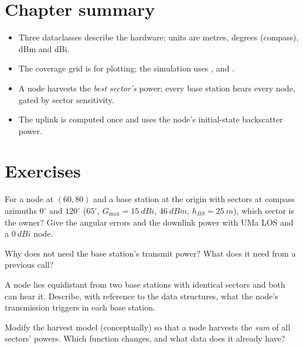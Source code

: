 \section{Chapter summary}
\begin{itemize}
 \item Three dataclasses describe the hardware; units are metres, degrees (compass), dBm and dBi.
 \item The coverage grid is for plotting; the simulation uses ,  and .
 \item A node harvests the \emph{best sector's} power; every base station hears every node, gated by sector sensitivity.
 \item The uplink is computed once and uses the node's initial-state backscatter power.
\end{itemize}

\section*{Exercises}
\begin{exercise}
For a node at $(60,80)$ and a base station at the origin with sectors at compass azimuths $0^\circ$ and $120^\circ$ ($65^\circ$, $G_{\max}=\SI{15}{dBi}$, $\SI{46}{dBm}$, $h_{BS}=\SI{25}{m}$), which sector is the owner? Give the angular errors and the downlink power with UMa LOS and a $\SI{0}{dBi}$ node.
\end{exercise}
\begin{exercise}
Why does  not need the base station's transmit power? What does it need from a previous call?
\end{exercise}
\begin{exercise}
A node lies equidistant from two base stations with identical sectors and both can hear it. Describe, with reference to the data structures, what the node's transmission triggers in each base station.
\end{exercise}
\begin{exercise}
Modify the harvest model (conceptually) so that a node harvests the \emph{sum} of all sectors' powers. Which function changes, and what data does it already have?
\end{exercise}
